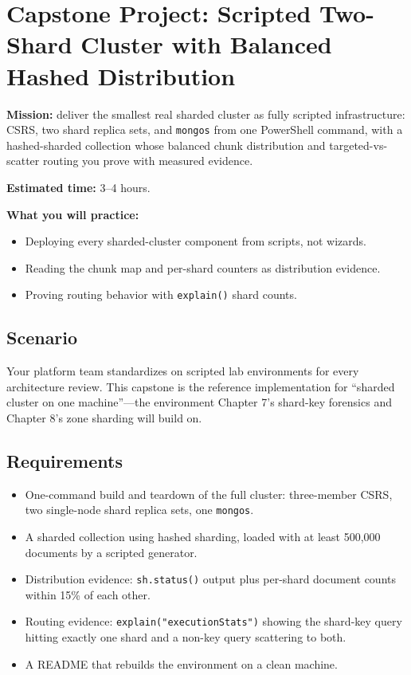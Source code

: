 \section{Capstone Project: Scripted Two-Shard Cluster with Balanced Hashed Distribution}\label{sec:ch6-capstone}

\begin{capstonebox}
\textbf{Mission:} deliver the smallest real sharded cluster as fully scripted infrastructure: CSRS, two shard replica sets, and \texttt{mongos} from one PowerShell command, with a hashed-sharded collection whose balanced chunk distribution and targeted-vs-scatter routing you prove with measured evidence.

\textbf{Estimated time:} 3--4 hours.

\textbf{What you will practice:}
\begin{itemize}
    \item Deploying every sharded-cluster component from scripts, not wizards.
    \item Reading the chunk map and per-shard counters as distribution evidence.
    \item Proving routing behavior with \texttt{explain()} shard counts.
\end{itemize}
\end{capstonebox}

\subsection*{Scenario}
Your platform team standardizes on scripted lab environments for every architecture review. This capstone is the reference implementation for ``sharded cluster on one machine''---the environment Chapter 7's shard-key forensics and Chapter 8's zone sharding will build on.

\subsection*{Requirements}
\begin{itemize}
    \item One-command build and teardown of the full cluster: three-member CSRS, two single-node shard replica sets, one \texttt{mongos}.
    \item A sharded collection using hashed sharding, loaded with at least 500{,}000 documents by a scripted generator.
    \item Distribution evidence: \texttt{sh.status()} output plus per-shard document counts within 15\% of each other.
    \item Routing evidence: \texttt{explain("executionStats")} showing the shard-key query hitting exactly one shard and a non-key query scattering to both.
    \item A README that rebuilds the environment on a clean machine.
\end{itemize}

